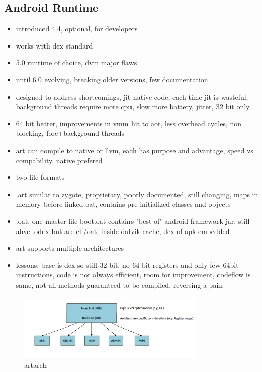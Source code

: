 \subsection{Android Runtime} \label{subsection:android-art}
\begin{itemize}
  \item introduced 4.4, optional, for developers
  \item works with dex standard
  \item 5.0 runtime of choice, dvm major flaws
  \item until 6.0 evolving, breaking older versions, few documentation
  \item designed to address shortcomings, jit \< native code, each time jit is wasteful, background threads require more cpu, slow more battery, jitter, 32 bit only
  \item 64 bit better, improvements in vmm hit to aot, less overhead cycles, non blocking, fore+background threads
  \item art can compile to native or llvm, each has purpose and advantage, speed vs compability, native prefered
  \item two file formats
  \item .art similar to zygote, proprietary, poorly documented, still changing, maps in memory before linked oat, contains pre-initialized classes and objects
  \item .oat, one master file boot.oat contains "best of" android framework jar, still ahve .odex but are elf/oat, inside dalvik cache, dex of apk embedded
  \item art supports multiple architectures
  \item lessons: base is dex so still 32 bit, no 64 bit registers and only few 64bit instructions, code is not always efficient, room for improvement, codeflow is same, not all methods guaranteed to be compiled, reversing a pain
\end{itemize}

\begin{figure}[h]
    \centering
    \includegraphics[width=0.8\textwidth]{data/artarch.png}
    \caption{artarch}
    \label{fig:artarch}
\end{figure}
